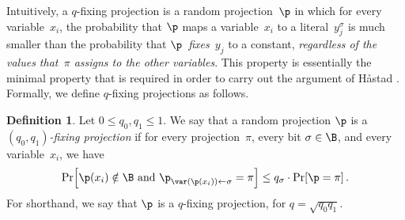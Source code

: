 \documentclass[11pt]{article}
\numberwithin{equation}{section}
\theoremstyle{definition}
\newtheorem{definition}[theorem]{Definition}
\theoremstyle{plain}
\theoremstyle{definition}\newtheorem{notation}[theorem]{Notation}\theoremstyle{plain}
\begin{document}
Intuitively, a $q$-fixing projection is a random projection~$\p$
in which for every variable~$x_{i}$, the probability that $\p$
maps a variable~$x_{i}$ to a literal~$y_{j}^{\sigma}$ is much
smaller than the probability that $\p$~\emph{fixes~}$y_{j}$ to
a constant, \emph{regardless of the values that~$\pi$ assigns to
the other variables}. This property is essentially the minimal property
that is required in order to carry out the argument of H{\aa}stad
\cite{H98}. Formally, we define $q$-fixing projections as follows. 
\begin{definition}
\label{def:fixing-projections}Let $0\le q_{0},q_{1}\le1$. We say that
a random projection $\p$ is a \emph{$(q_{0},q_{1})$-fixing projection}
if for every projection~$\pi$, every bit $\sigma\in\B$, and every
variable~$x_{i}$, we have 
\begin{equation}
\Pr\!\left[\p(x_{i})\notin\B\text{ and }\p_{\var(\p(x_{i}))\gets\sigma}=\pi\right]\le q_{\sigma}\cdot\Pr\!\left[\p=\pi\right].\label{eq:fixing-projection}
\end{equation}
For shorthand, we say that $\p$ is a $q$-fixing projection, for
$q=\sqrt{q_{0}q_{1}}$. 
\end{definition}
\end{document}
